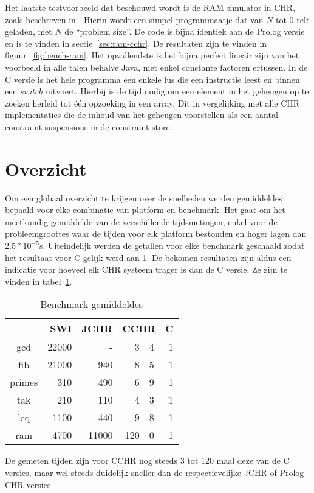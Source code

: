 Het laatste testvoorbeeld dat beschouwd wordt is de RAM simulator in CHR, zoals beschreven in \cite{jon:complexity:chr05}. Hierin wordt een simpel programmaatje dat van $N$ tot $0$ telt geladen, met $N$ de ``problem size''. De code is bijna identiek aan de Prolog versie en is te vinden in sectie~\ref{sec:ram-cchr}.
De resultaten zijn te vinden in figuur~\ref{fig:bench-ram}. Het opvallendste is het bijna perfect lineair zijn van het voorbeeld in alle talen behalve Java, met enkel constante factoren ertussen. In de C versie is het hele programma een enkele lus die een instructie leest en binnen een {\em switch} uitvoert. Hierbij is de tijd nodig om een element in het geheugen op te zoeken herleid tot \'e\'en opzoeking in een array. Dit in vergelijking met alle CHR implementaties die de inhoud van het geheugen voorstellen als een aantal constraint suspensions in de constraint store.

\section{Overzicht} \label{sec:bench-end}

Om een globaal overzicht te krijgen over de snelheden werden gemiddeldes bepaald voor elke combinatie van platform en benchmark. Het gaat om het meetkundig gemiddelde van de verschillende tijdsmetingen, enkel voor de probleemgroottes waar de tijden voor elk platform bestonden en hoger lagen dan $2.5 * 10^{-5}$s. Uiteindelijk werden de getallen voor elke benchmark geschaald zodat het resultaat voor C gelijk werd aan 1. De bekomen resultaten zijn aldus een indicatie voor hoeveel elk CHR systeem trager is dan de C versie. Ze zijn te vinden in tabel~\ref{tbl:benches}.
\begin{table}
\begin{center}
\begin{tabular}{c|rrr@{.}lr}
 & {\bf SWI} & {\bf JCHR} & \multicolumn{2}{c}{\bf CCHR} & {\bf C} \\
\hline
gcd    & 22000 & -     &   3&4  & 1 \\
fib    & 21000 & 940   &   8&5  & 1 \\
primes & 310   & 490   &   6&9  & 1 \\
tak    & 210   & 110   &   4&3  & 1 \\
leq    & 1100  & 440   &   9&8  & 1 \\
ram    & 4700  & 11000 &  120&0 & 1 \\
\end{tabular}
\caption{Benchmark gemiddeldes}
\label{tbl:benches}
\end{center}
\end{table}
De gemeten tijden zijn voor CCHR nog steeds 3 tot 120 maal deze van de C versies, maar wel steeds duidelijk sneller dan de respectievelijke JCHR of Prolog CHR versies.